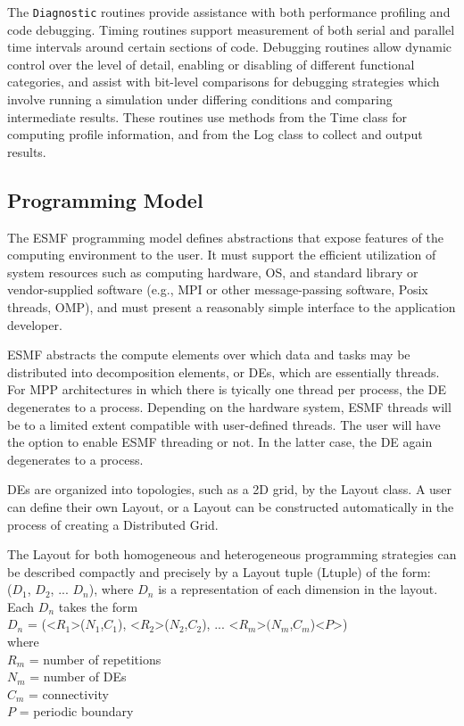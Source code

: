 The {\tt Diagnostic} routines provide assistance with both performance
profiling and code debugging.  Timing routines support measurement
of both serial and parallel time intervals around certain sections
of code.  Debugging routines allow dynamic control over the level
of detail, enabling or disabling of different functional categories,
and assist with bit-level comparisons for debugging strategies which 
involve running a simulation under differing conditions and
comparing intermediate results.  These routines use methods from
the Time class for computing profile information, and from 
the Log class to collect and output results.

\subsection{Programming Model}
\label{sec:progmodel}

The ESMF programming model defines abstractions that expose
features of the computing environment to the user.  It must support the 
efficient utilization of system resources such as   
computing hardware, OS, and standard library or vendor-supplied 
software (e.g., MPI or other message-passing software, Posix threads, OMP),
and must present a reasonably simple interface to the application 
developer.  

ESMF abstracts the compute elements over which data and tasks may be
distributed into decomposition elements, or DEs, which
are essentially threads.  For MPP architectures in which there
is tyically one thread per process, the DE degenerates to a process.
Depending on the hardware system, ESMF threads will be to a limited 
extent compatible with user-defined threads.  The user will have 
the option to enable ESMF threading or not.  In the latter case, the
DE again degenerates to a process.

DEs are organized into topologies, such as a 2D grid, by the Layout 
class.  A user can define their own Layout, or a Layout can be 
constructed automatically in the process of creating a Distributed 
Grid.  

The Layout for both homogeneous and heterogeneous programming
strategies can be described compactly and precisely by a Layout 
tuple (Ltuple) of the form: \\
($D_{1}$, $D_{2}$, ... $D_{n}$), where $D_{n}$ is a representation of
each dimension in the layout.  \\
Each $D_{n}$ takes the form \\
$D_{n}$ = (<$R_{1}$>($N_{1}$,$C_{1}$), <$R_{2}$>($N_{2}$,$C_{2}$), ... <$R_{m}$>$(N_{m}$,$C_{m}$)<$P$>) \\
where \\
$R_{m}$ = number of repetitions \\
$N_{m}$ = number of DEs \\
$C_{m}$ = connectivity \\
$P$ = periodic boundary \\

